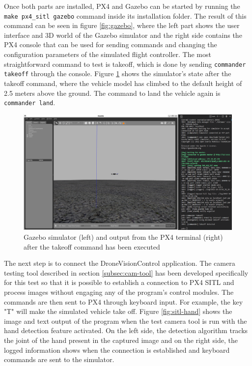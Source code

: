 Once both parts are installed, PX4 and Gazebo can be started by running the \texttt{make\ px4\_sitl\ gazebo} command inside its installation folder.
The result of this command can be seen in figure \ref{fig:gazebo}, where the left part shows the user interface and 3D world of the Gazebo simulator and the right side contains the PX4 console that can be used for sending commands and changing the configuration parameters of the simulated flight controller.
The most straightforward command to test is takeoff, which is done by sending \texttt{commander takeoff} through the console.
Figure \ref{fig:gazebo-takeoff} shows the simulator's state after the takeoff command, where the vehicle model has climbed to the default height of 2.5 meters above the ground.
The command to land the vehicle again is \texttt{commander land}.

\begin{figure}
  \centering
  \includegraphics[width=\textwidth, keepaspectratio]{img/gazebo-takeoff.png}
  \caption{Gazebo simulator (left) and output from the PX4 terminal (right) after the takeoff command has been executed}\label{fig:gazebo-takeoff}
\end{figure}

The next step is to connect the DroneVisionControl application.
The camera testing tool described in section \ref{subsec:cam-tool} has been developed specifically for this test so that it is possible to establish a connection to PX4 SITL and process images without engaging any of the program's control modules.
The commands are then sent to PX4 through keyboard input.
For example, the key "T" will make the simulated vehicle take off.
Figure \ref{fig:sitl-hand} shows the image and text output of the program when the test camera tool is run with the hand detection feature activated.
On the left side, the detection algorithm tracks the joint of the hand present in the captured image and on the right side, the logged information shows when the connection is established and keyboard commands are sent to the simulator.



